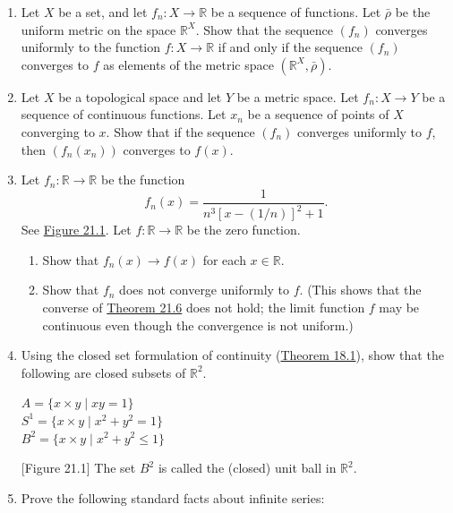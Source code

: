 \begin{enumerate}[itemsep=0.4em, parsep=0pt, topsep=0pt, partopsep=0pt, leftmargin=*, label=\arabic*., ref=\arabic*]
\item Let \(X\) be a set, and let \(f_{n} : X \rightarrow \mathbb{R}\) be a sequence of functions. Let \(\bar{\rho }\) be the uniform metric on the space \(\mathbb{R}^{X}\). Show that the sequence \(( f_{n})\) converges uniformly to the function \(f : X \rightarrow \mathbb{R}\) if and only if the sequence \(( f_{n})\) converges to \(f\) as elements of the metric space \(( {\mathbb{R}^{X},\bar{\rho }})\).
\item Let \(X\) be a topological space and let \(Y\) be a metric space. Let \(f_{n} : X \rightarrow Y\) be a sequence of continuous functions. Let \(x_{n}\) be a sequence of points of \(X\) converging to \(x\). Show that if the sequence \(( f_{n})\) converges uniformly to \(f\), then \(( {f_{n}( x_{n}) })\) converges to \(f(x)\).
\item Let \(f_{n} : \mathbb{R} \rightarrow \mathbb{R}\) be the function \[ f_{n}(x) = \frac{1}{n^{3}{[ x - ( 1/n) ] }^{2} + 1}. \] See \hyperref[fig:21.1]{Figure 21.1}. Let \(f : \mathbb{R} \rightarrow \mathbb{R}\) be the zero function.
  \begin{enumerate}[itemsep=0.2em, parsep=0pt, topsep=0pt, partopsep=0pt, leftmargin=*, label=(\alph*), align=left]
  \item Show that \(f_{n}(x) \rightarrow f(x)\) for each \(x \in \mathbb{R}\).
  \item Show that \(f_{n}\) does not converge uniformly to \(f\). (This shows that the converse of \hyperref[thm:21.6]{Theorem 21.6} does not hold; the limit function \(f\) may be continuous even though the convergence is not uniform.)
  \end{enumerate}
\item Using the closed set formulation of continuity (\hyperref[thm:18.1]{Theorem 18.1}), show that the following are closed subsets of \(\mathbb{R}^{2}\).
  \begin{center}
  \(A = \{ x \times y \mid {xy} = 1 \}\) \\[0.4em]
  \(S^{1} = \{ x \times y \mid {x}^{2} + y^{2} = 1 \}\) \\[0.4em]
  \(B^{2} = \{ x \times y \mid {x}^{2} + y^{2} \leq 1 \}\)
  \end{center}
  [Figure 21.1] The set \(B^{2}\) is called the (closed) unit ball in \(\mathbb{R}^{2}\).
\item Prove the following standard facts about infinite series:
  \begin{enumerate}[itemsep=0.2em, parsep=0pt, topsep=0pt, partopsep=0pt, leftmargin=*, label=(\alph*), align=left]

\end{enumerate}
\end{enumerate}
